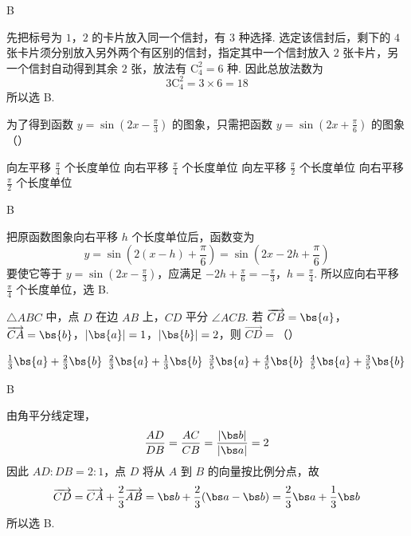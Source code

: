 \begin{answer}
B
\end{answer}

\begin{solution}
先把标号为 \(1\)，\(2\) 的卡片放入同一个信封，有 \(3\) 种选择. 选定该信封后，剩下的 \(4\) 张卡片须分别放入另外两个有区别的信封，指定其中一个信封放入 \(2\) 张卡片，另一个信封自动得到其余 \(2\) 张，放法有 \(\mathrm C_4^2=6\) 种. 因此总放法数为
\[
3\mathrm C_4^2=3\times6=18
\]
所以选 B.
\end{solution}

\begin{problem}
为了得到函数 \( y = \sin \left(2x - \frac{\pi}{3}\right) \) 的图象，只需把函数 \( y = \sin \left(2x + \frac{\pi}{6}\right) \) 的图象（\quad）

\choices
    {向左平移 \(\frac{\pi}{4}\text{ 个长度单位}\)}
    {向右平移 \(\frac{\pi}{4}\text{ 个长度单位}\)}
    {向左平移 \(\frac{\pi}{2}\text{ 个长度单位}\)}
    {向右平移 \(\frac{\pi}{2}\text{ 个长度单位}\)}
\end{problem}

\begin{answer}
B
\end{answer}

\begin{solution}
把原函数图象向右平移 \(h\) 个长度单位后，函数变为
\[
y=\sin\left(2(x-h)+\frac{\pi}{6}\right)=\sin\left(2x-2h+\frac{\pi}{6}\right)
\]
要使它等于 \(y=\sin(2x-\frac{\pi}{3})\)，应满足
\(-2h+\frac{\pi}{6}=-\frac{\pi}{3}\)，\(h=\frac{\pi}{4}\).
所以应向右平移 \(\frac{\pi}{4}\) 个长度单位，选 B.
\end{solution}

\begin{problem}
\(\triangle ABC\) 中，点 \(D\) 在边 \(AB\) 上，\(CD\) 平分 \(\angle ACB\). 若 \(\overrightarrow{CB} = \bs{a}\)，\(\overrightarrow{CA} = \bs{b}\)，\(|\bs{a}| = 1\)，\(|\bs{b}| = 2\)，则 \(\overrightarrow{CD} =\)（\quad）

\choices
    {\(\frac{1}{3} \bs{a} + \frac{2}{3} \bs{b}\)}
    {\(\frac{2}{3} \bs{a} + \frac{1}{3} \bs{b}\)}
    {\(\frac{3}{5} \bs{a} + \frac{4}{5} \bs{b}\)}
    {\(\frac{4}{5} \bs{a} + \frac{3}{5} \bs{b}\)}
\end{problem}

\begin{answer}
B
\end{answer}

\begin{solution}
由角平分线定理，
\[
\frac{AD}{DB}=\frac{AC}{CB}=\frac{|\bs b|}{|\bs a|}=2
\]
因此 \(AD:DB=2:1\)，点 \(D\) 将从 \(A\) 到 \(B\) 的向量按比例分点，故
\[
\overrightarrow{CD}=\overrightarrow{CA}+\frac{2}{3}\overrightarrow{AB}
=\bs b+\frac{2}{3}(\bs a-\bs b)
=\frac{2}{3}\bs a+\frac{1}{3}\bs b
\]
所以选 B.
\end{solution}

